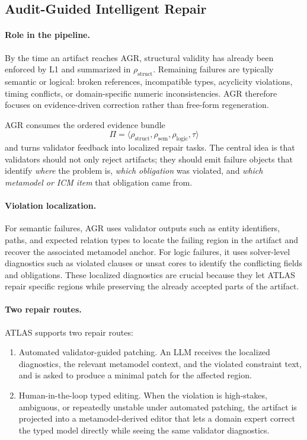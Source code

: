 \documentclass[acmlarge,nonacm]{acmart}
\theoremstyle{acmplain}
\theoremstyle{acmdefinition}
\begin{document}
\subsection{Audit-Guided Intelligent Repair}
\label{sec:validation-repair}

\paragraph{Role in the pipeline.}
By the time an artifact reaches AGR, structural validity has already been enforced by L1 and summarized in $\rho_{\text{struct}}$. Remaining failures are typically semantic or logical: broken references, incompatible types, acyclicity violations, timing conflicts, or domain-specific numeric inconsistencies. AGR therefore focuses on evidence-driven correction rather than free-form regeneration.

AGR consumes the ordered evidence bundle
\[
\Pi
=
\langle \rho_{\text{struct}}, \rho_{\text{sem}}, \rho_{\text{logic}}, \tau \rangle
\]
and turns validator feedback into localized repair tasks. The central idea is that validators should not only reject artifacts; they should emit failure objects that identify \emph{where} the problem is, \emph{which obligation} was violated, and \emph{which metamodel or ICM item} that obligation came from.

\paragraph{Violation localization.}
For semantic failures, AGR uses validator outputs such as entity identifiers, paths, and expected relation types to locate the failing region in the artifact and recover the associated metamodel anchor. For logic failures, it uses solver-level diagnostics such as violated clauses or unsat cores to identify the conflicting fields and obligations. These localized diagnostics are crucial because they let ATLAS repair specific regions while preserving the already accepted parts of the artifact.

\paragraph{Two repair routes.}
ATLAS supports two repair routes:
\begin{enumerate}[label=(\roman*),leftmargin=*,itemsep=0.5ex]
  \item Automated validator-guided patching.
        An LLM receives the localized diagnostics, the relevant metamodel context, and the violated constraint text, and is asked to produce a minimal patch for the affected region.
  \item Human-in-the-loop typed editing.
        When the violation is high-stakes, ambiguous, or repeatedly unstable under automated patching, the artifact is projected into a metamodel-derived editor that lets a domain expert correct the typed model directly while seeing the same validator diagnostics.
\end{enumerate}
\end{document}
